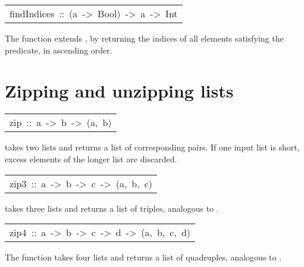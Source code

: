 \begin{haddockdesc}
\item[\begin{tabular}{@{}l}
findIndices\ ::\ (a\ ->\ Bool)\ ->\ {\char 91}a{\char 93}\ ->\ {\char 91}Int{\char 93}
\end{tabular}]\haddockbegindoc
The  function extends , by returning the
 indices of all elements satisfying the predicate, in ascending order.
\par

\end{haddockdesc}
\section{Zipping and unzipping lists
}
\begin{haddockdesc}
\item[\begin{tabular}{@{}l}
zip\ ::\ {\char 91}a{\char 93}\ ->\ {\char 91}b{\char 93}\ ->\ {\char 91}(a,\ b){\char 93}
\end{tabular}]\haddockbegindoc
{} takes two lists and returns a list of corresponding pairs.
 If one input list is short, excess elements of the longer list are
 discarded.
\par

\end{haddockdesc}
\begin{haddockdesc}
\item[\begin{tabular}{@{}l}
zip3\ ::\ {\char 91}a{\char 93}\ ->\ {\char 91}b{\char 93}\ ->\ {\char 91}c{\char 93}\ ->\ {\char 91}(a,\ b,\ c){\char 93}
\end{tabular}]\haddockbegindoc
{} takes three lists and returns a list of triples, analogous to
 .
\par

\end{haddockdesc}
\begin{haddockdesc}
\item[\begin{tabular}{@{}l}
zip4\ ::\ {\char 91}a{\char 93}\ ->\ {\char 91}b{\char 93}\ ->\ {\char 91}c{\char 93}\ ->\ {\char 91}d{\char 93}\ ->\ {\char 91}(a,\ b,\ c,\ d){\char 93}
\end{tabular}]\haddockbegindoc
The  function takes four lists and returns a list of
 quadruples, analogous to .
\par

\end{haddockdesc}
